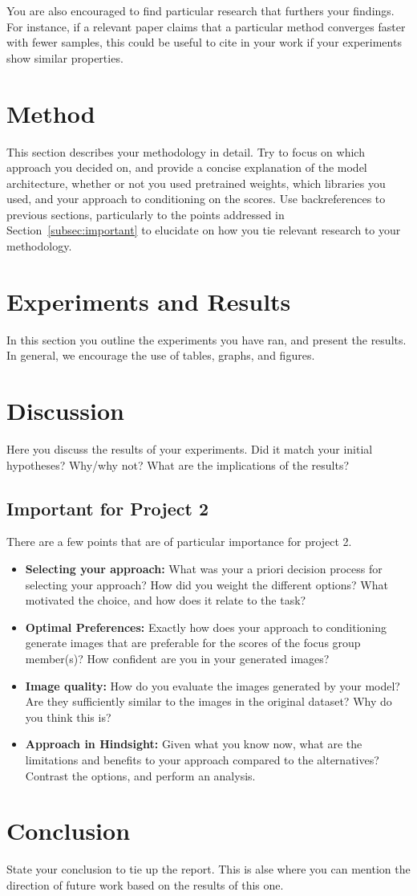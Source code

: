 \documentclass[10pt]{article}
\begin{document}
You are also encouraged to find particular research that furthers your findings. For instance, if a relevant paper claims that a particular method converges faster with fewer samples, this could be useful to cite in your work if your experiments show similar properties.

\section{Method}
This section describes your methodology in detail. Try to focus on which approach you decided on, and provide a concise explanation of the model architecture, whether or not you used pretrained weights, which libraries you used, and your approach to conditioning on the scores. Use backreferences to previous sections, particularly to the points addressed in Section~\ref{subsec:important} to elucidate on how you tie relevant research to your methodology.

\section{Experiments and Results}
In this section you outline the experiments you have ran, and present the results.
In general, we encourage the use of tables, graphs, and figures.

\section{Discussion}
Here you discuss the results of your experiments. Did it match your initial hypotheses? Why/why not? What are the implications of the results?

\subsection{Important for Project 2}
There are a few points that are of particular importance for project 2.
\begin{itemize}
  \item \textbf{Selecting your approach:} What was your a priori decision process for selecting your approach? How did you weight the different options? What motivated the choice, and how does it relate to the task?
  \item \textbf{Optimal Preferences:} Exactly how does your approach to conditioning generate images that are preferable for the scores of the focus group member(s)? How confident are you in your generated images?
  \item \textbf{Image quality:} How do you evaluate the images generated by your model? Are they sufficiently similar to the images in the original dataset? Why do you think this is?
  \item \textbf{Approach in Hindsight:} Given what you know now, what are the limitations and benefits to your approach compared to the alternatives? Contrast the options, and perform an analysis.
\end{itemize}

\section{Conclusion}
State your conclusion to tie up the report. This is alse where you can mention the direction of future work based on the results of this one.



\end{document}
